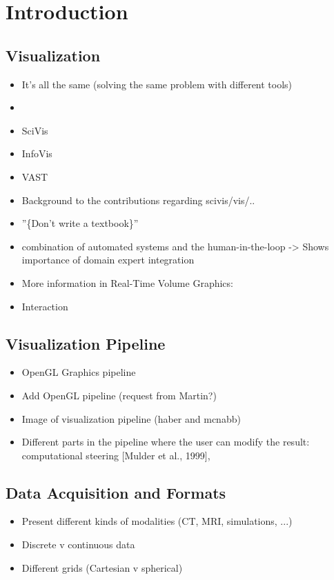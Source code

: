 \chapter{Introduction}
\label{ch:introduction}

\section{Visualization}
\begin{itemize}
\item It's all the same (solving the same problem with different tools) \item \cite{card1999readings} \cite{tory2002model}
\item SciVis
\item InfoVis
\item VAST
\item Background to the contributions regarding scivis/vis/..
\item ''\{Don't write a textbook\}''
\item combination of automated systems and the human-in-the-loop \cite{munzner2014visualization} \cite{van2005value} -> Shows importance of domain expert integration
\item More information in Real-Time Volume Graphics: \cite{engel2006real}
\item Interaction
\end{itemize}

\section{Visualization Pipeline}
\begin{itemize}
\item OpenGL Graphics pipeline \cite{segal2016opengl}
\item Add OpenGL pipeline (request from Martin?)
\item Image of visualization pipeline (haber and mcnabb)
\item Different parts in the pipeline where the user can modify the result: computational steering [Mulder et al., 1999],
\end{itemize}

\section{Data Acquisition and Formats}
\begin{itemize}
\item Present different kinds of modalities (CT, MRI, simulations, ...)
\item Discrete v continuous data \cite{tory2002model}
\item Different grids (Cartesian v spherical)
\end{itemize}

